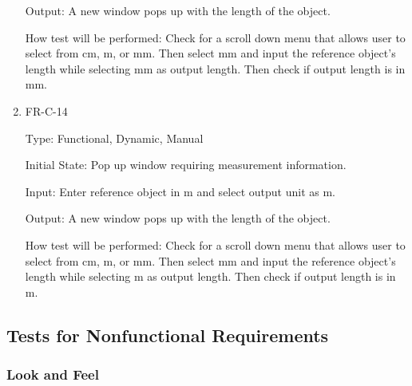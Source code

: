\documentclass[12pt, titlepage]{article}
\begin{document}
\begin{enumerate}
					Output: A new window pops up with the length of the object.
					
					How test will be performed: Check for a scroll down menu that allows user to select from cm, m, or mm. Then select mm and input the reference object's length while selecting mm as output length. Then check if output length is in mm.
					
						\item{FR-C-14\\}
					
					Type: Functional, Dynamic, Manual
					
					Initial State: Pop up window requiring measurement information.
					
					Input: Enter reference object in m and select output unit as m.
					
					Output: A new window pops up with the length of the object.
					
					How test will be performed: Check for a scroll down menu that allows user to select from cm, m, or mm. Then select mm and input the reference object's length while selecting m as output length. Then check if output length is in m.
				


\end{enumerate}

\subsection{Tests for Nonfunctional Requirements}

\subsubsection{Look and Feel}
		
\end{document}
